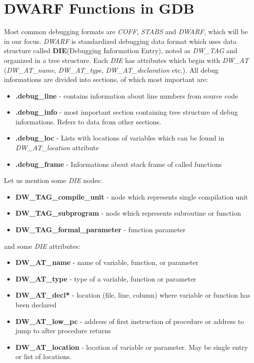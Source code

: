 \documentclass{report}
\begin{document}
\chapter *{DWARF Functions in GDB}
	Most common debugging formats are \textit{COFF}, \textit{STABS} and \textit{DWARF}, which will be in our focus. \textit{DWARF} is standardized debugging data format which uses data structure called \textbf{DIE}(Debugging Information Entry), noted as \textit{DW\_TAG} and organized in a tree structure.  Each \textit{DIE} has attributes which begin with \textit{DW\_AT} (\textit{DW\_AT\_name}, \textit{DW\_AT\_type}, \textit{DW\_AT\_declaration} etc.). All debug informations are divided into sections, of which most important are:
	\begin{itemize}
		\item \textbf{.debug\_line} - contains information about line numbers from source code
		\item \textbf{.debug\_info} - most important section containing tree structure of debug informations. Refers to data from other sections.
		\item \textbf{.debug\_loc} - Lists with locations of variables which can be found in \textit{DW\_AT\_location} attribute
		\item \textbf{.debug\_frame} - Informations about stack frame of called functions
	\end{itemize}
	Let us mention some \textit{DIE} nodes:
	\begin{itemize}
		\item \textbf{DW\_TAG\_compile\_unit} - node which represents single compilation unit
		\item \textbf{DW\_TAG\_subprogram} - node which represents subroutine or function
		\item \textbf{DW\_TAG\_formal\_parameter} - function parameter
	\end{itemize}
	and some \textit{DIE} attributes:
	\begin{itemize}
		\item \textbf{DW\_AT\_name} - name of variable, function, or parameter
		\item \textbf{DW\_AT\_type} - type of a variable, function or parameter
		\item \textbf{DW\_AT\_decl*} - location (file, line, column) where variable or function has been declared
		\item \textbf{DW\_AT\_low\_pc} - address of first instruction of procedure or address to jump to after procedure returns
		\item \textbf{DW\_AT\_location} - location of variable or parameter. May be single entry or list of locations.
	\end{itemize}
\end{document}
